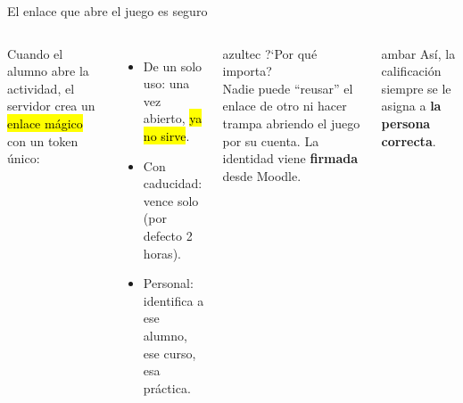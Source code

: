 \begin{frame}{El enlace que abre el juego es seguro}
\vspace{0.25cm}
\begin{columns}[T]
Cuando el alumno abre la actividad, el servidor crea un \hl{enlace m\'agico} con un
token \'unico:
\begin{itemize}\setlength\itemsep{5pt}
  \item \demi De un solo uso: una vez abierto, \hl{ya no sirve}.
  \item \demi Con caducidad: vence solo (por defecto 2 horas).
  \item \demi Personal: identifica a ese alumno, ese curso, esa pr\'actica.
\end{itemize}
\begin{tarjetabox}{azultec}
{\demi\color{azultec}?`Por qu\'e importa?}\\[3pt]
Nadie puede ``reusar'' el enlace de otro ni hacer trampa abriendo el juego por su
cuenta. La identidad viene \textbf{firmada} desde Moodle.
\end{tarjetabox}
\begin{calloutbox}{ambar}
\demi As\'i, la calificaci\'on siempre se le asigna a \textbf{la persona correcta}.
\end{calloutbox}
\end{columns}
\end{frame}

